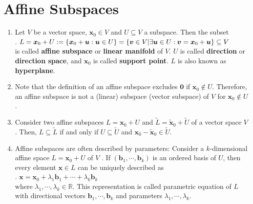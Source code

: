 \section{Affine Subspaces}

\begin{enumerate}
    \item
    \begin{definition}
        Let $V$ be a vector space, $\bm{x}_0 \in V$ and $U \subseteq V$ a subspace. 
        Then the subset 
        \hfill \cite{mfml/book/mml/Deisenroth-Faisal-Ong}
        \\
        .\hfill
        $
            L 
            = \bm{x}_0 + U 
            := \left\{\bm{x}_0 + \bm{u} : \bm{u} \in  U\right\}
            = \left\{\bm{v} \in  V | \exists \bm{u} \in  U : \bm{v} = \bm{x}_0 + \bm{u}\right\} \subseteq V
        $
        \hfill \cite{mfml/book/mml/Deisenroth-Faisal-Ong}
        \\
        is called \textbf{affine subspace} or \textbf{linear manifold} of $V$.
        $U$ is called \textbf{direction} or \textbf{direction space}, and $\bm{x}_0$ is called \textbf{support point}.
        $L$ is also known as \textbf{hyperplane}.
        \hfill \cite{mfml/book/mml/Deisenroth-Faisal-Ong}
    \end{definition}

    \item Note that the definition of an affine subspace excludes $\bm{0}$ if $\bm{x}_0 \notin U$.
    Therefore, an affine subspace is not a (linear) subspace (vector subspace) of $V$ for $\bm{x}_0 \notin U$.
    \hfill \cite{mfml/book/mml/Deisenroth-Faisal-Ong}

    \item Consider two affine subspaces $L = \bm{x}_0 + U$ and $\tilde{L} = \tilde{\bm{x}}_0 + \tilde{U}$ of a vector space $V$ . 
    Then, $L \subseteq \tilde{L}$ if and only if $U \subseteq \tilde{U}$ and $\bm{x}_0 - \tilde{\bm{x}}_0 \in \tilde{U}$.
    \hfill \cite{mfml/book/mml/Deisenroth-Faisal-Ong}

    \item Affine subspaces are often described by parameters: Consider a $k$-dimensional affine space $L = \bm{x}_0 + U$ of $V$ . 
    If $(\bm{b}_1, \cdots , \bm{b}_k)$ is an ordered basis of $U$, then every element $\bm{x} \in L$ can be uniquely described as
    \hfill \cite{mfml/book/mml/Deisenroth-Faisal-Ong}
    \\
    .\hfill
    $
        \bm{x} = \bm{x}_0 + \lambda _1 \bm{b}_1 + \cdots + \lambda _k \bm{b}_k
    $
    \hfill \cite{mfml/book/mml/Deisenroth-Faisal-Ong}
    \\
    where $\lambda _1, \cdots , \lambda _k \in \mathbb{R}$. 
    This representation is called parametric equation of $L$ with directional vectors $\bm{b}_1, \cdots , \bm{b}_k$ and parameters $\lambda _1, \cdots , \lambda _k$.
    \hfill \cite{mfml/book/mml/Deisenroth-Faisal-Ong}


\end{enumerate}
